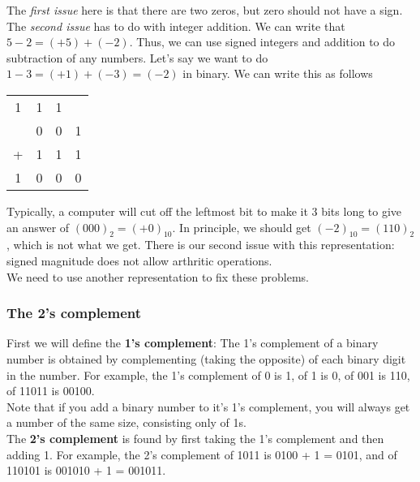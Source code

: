 \documentclass[]{article}
\begin{document}
The \textit{first issue} here is that there are two zeros, but zero should not have a sign.\\

The \textit{second issue} has to do with integer addition. We can write that $5 - 2 = (+5) + (-2)$. Thus, we can use signed integers and addition to do subtraction of any numbers. Let's say we want to do $1 - 3 = (+1) + (-3) = (-2)$ in binary. We can write this as follows\\

\begin{center}
	\begin{tabular}{cccc}
		\tiny 1& \tiny 1 & \tiny 1 &  \\
		& 0 & 0 & 1 \\
		+ & 1  & 1 & 1 \\
		\hline
		1 & 0 & 0 & 0 \\
	\end{tabular}
	\bigbreak
\end{center}

Typically, a computer will cut off the leftmost bit to make it 3 bits long to give an answer of $(000)_2 = (+0)_{10}$. In principle, we should get $(-2)_{10} = (110)_2$, which is not what we get. There is our second issue with this representation: signed magnitude does not allow arthritic operations.\\ 

We need to use another representation to fix these problems.\\

\subsubsection{The 2's complement}
\bigbreak

First we will define the \textbf{1's complement}: The 1's complement of a binary number is obtained by complementing (taking the opposite) of each binary digit in the number. For example, the 1's complement of 0 is 1, of 1 is 0, of 001 is 110, of 11011 is 00100. \\

Note that if you add a binary number to it's 1's complement, you will always get a number of the same size, consisting only of 1s.\\

The \textbf{2's complement} is found by first taking the 1's complement and then adding 1. For example, the 2's complement of 1011 is 0100 + 1 = 0101, and of 110101 is 001010 + 1 = 001011. \\
\end{document}
